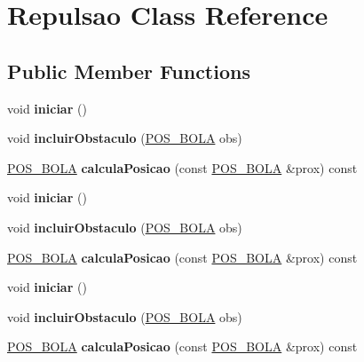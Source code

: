 \hypertarget{classRepulsao}{}\section{Repulsao Class Reference}
\label{classRepulsao}
\subsection*{Public Member Functions}
\begin{DoxyCompactItemize}
\item 
void {\bfseries iniciar} ()\hypertarget{classRepulsao_ac6c265b94fbaf1c2fe6a3b8c88df9198}{}\label{classRepulsao_ac6c265b94fbaf1c2fe6a3b8c88df9198}

\item 
void {\bfseries incluir\+Obstaculo} (\hyperlink{structPOS__BOLA}{P\+O\+S\+\_\+\+B\+O\+LA} obs)\hypertarget{classRepulsao_ad38aafecda10f0d76bb9d83e6bfd26a5}{}\label{classRepulsao_ad38aafecda10f0d76bb9d83e6bfd26a5}

\item 
\hyperlink{structPOS__BOLA}{P\+O\+S\+\_\+\+B\+O\+LA} {\bfseries calcula\+Posicao} (const \hyperlink{structPOS__BOLA}{P\+O\+S\+\_\+\+B\+O\+LA} \&prox) const \hypertarget{classRepulsao_ac9be39159f4bee690be2765eaa80db2d}{}\label{classRepulsao_ac9be39159f4bee690be2765eaa80db2d}

\item 
void {\bfseries iniciar} ()\hypertarget{classRepulsao_ac6c265b94fbaf1c2fe6a3b8c88df9198}{}\label{classRepulsao_ac6c265b94fbaf1c2fe6a3b8c88df9198}

\item 
void {\bfseries incluir\+Obstaculo} (\hyperlink{structPOS__BOLA}{P\+O\+S\+\_\+\+B\+O\+LA} obs)\hypertarget{classRepulsao_ad38aafecda10f0d76bb9d83e6bfd26a5}{}\label{classRepulsao_ad38aafecda10f0d76bb9d83e6bfd26a5}

\item 
\hyperlink{structPOS__BOLA}{P\+O\+S\+\_\+\+B\+O\+LA} {\bfseries calcula\+Posicao} (const \hyperlink{structPOS__BOLA}{P\+O\+S\+\_\+\+B\+O\+LA} \&prox) const \hypertarget{classRepulsao_ac9be39159f4bee690be2765eaa80db2d}{}\label{classRepulsao_ac9be39159f4bee690be2765eaa80db2d}

\item 
void {\bfseries iniciar} ()\hypertarget{classRepulsao_ac6c265b94fbaf1c2fe6a3b8c88df9198}{}\label{classRepulsao_ac6c265b94fbaf1c2fe6a3b8c88df9198}

\item 
void {\bfseries incluir\+Obstaculo} (\hyperlink{structPOS__BOLA}{P\+O\+S\+\_\+\+B\+O\+LA} obs)\hypertarget{classRepulsao_ad38aafecda10f0d76bb9d83e6bfd26a5}{}\label{classRepulsao_ad38aafecda10f0d76bb9d83e6bfd26a5}

\item 
\hyperlink{structPOS__BOLA}{P\+O\+S\+\_\+\+B\+O\+LA} {\bfseries calcula\+Posicao} (const \hyperlink{structPOS__BOLA}{P\+O\+S\+\_\+\+B\+O\+LA} \&prox) const \hypertarget{classRepulsao_ac9be39159f4bee690be2765eaa80db2d}{}\label{classRepulsao_ac9be39159f4bee690be2765eaa80db2d}

\end{DoxyCompactItemize}
